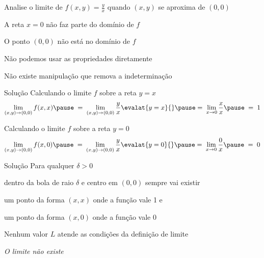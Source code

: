 \begin{question}
  Analise o limite de \(f(x, y) = \frac{y}{x}\)
  quando \((x, y)\)  se aproxima de \((0, 0)\)

  \pause
  \vspace{\baselineskip}
  A reta \(x=0\) não faz parte do domínio de $f$

  \pause
  O ponto \((0, 0)\) não está no domínio de $f$

  \pause
  Não podemos usar as propriedades diretamente

  \pause
  Não existe manipulação que remova a indeterminação
\end{question}

\begin{resolution}{Solução}
  Calculando o limite $f$ sobre a reta \(y=x\)
  \pause
  \[
    \lim_{(x, y)\to(0, 0)} f(x, x)
    \pause
    \;=\; \lim_{(x, y)\to(0, 0)} \frac{y}{x} \evalat{y=x}{}
    \pause
    =\; \lim_{x\to 0} \frac{x}{x}
    \pause
    \;=\; 1
  \]

  \pause
  \bigskip
  Calculando o limite $f$ sobre a reta \(y=0\)
  \pause
  \[
    \lim_{(x, y)\to(0, 0)} f(x, 0)
    \pause
    \;=\; \lim_{(x, y)\to(0, 0)} \frac{y}{x} \evalat{y=0}{}
    \pause
    =\; \lim_{x\to 0} \frac{0}{x}
    \pause
    \;=\; 0
  \]
\end{resolution}

\begin{resolution}{Solução}
  Para qualquer $\delta>0$

  \pause
  dentro da bola de raio $\delta$ e centro em \((0, 0)\)
  \pause
  sempre vai existir

  \pause
  um ponto da forma \((x, x)\) onde a função vale 1 e

  \pause
  um ponto da forma \((x, 0)\) onde a  função vale 0

  \pause
  \medskip
  Nenhum valor $L$ atende as condições da definição de limite

  \pause
  \bigskip
  \emph{O limite não existe}
\end{resolution}

